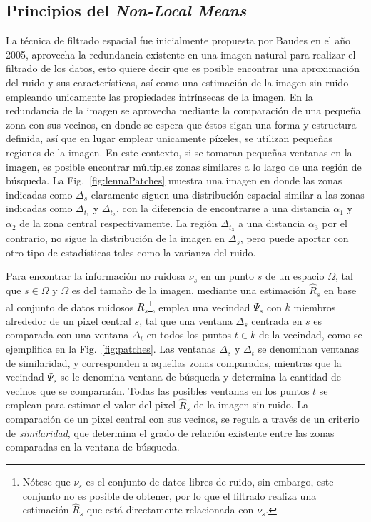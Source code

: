 \subsection{Principios del \textit{Non-Local Means}}

La técnica de filtrado espacial \nlmeans fue inicialmente propuesta por Baudes \etal \cite{Baudes2005} en el año 2005, \nlmeans aprovecha la redundancia existente en una imagen natural para realizar el filtrado de los datos, esto quiere decir que es posible encontrar una aproximación del ruido y sus características, así como una estimación de la imagen sin ruido empleando unicamente las propiedades intrínsecas de la imagen. En \nlmeans la redundancia de la imagen se aprovecha mediante la comparación de una pequeña zona con sus vecinos, en donde se espera que éstos sigan una forma y estructura definida, así que en lugar emplear unicamente píxeles, se utilizan pequeñas regiones de la imagen. En este contexto, si se tomaran pequeñas ventanas en la imagen, es posible encontrar múltiples zonas similares a lo largo de una región de búsqueda. La Fig.~\ref{fig:lennaPatches} muestra una imagen en donde las zonas indicadas como $\Delta_s$ claramente siguen una distribución espacial similar a las zonas indicadas como $\Delta_{t_1}$ y $\Delta_{t_2}$, con la diferencia de encontrarse a una distancia $\alpha_1$ y $\alpha_2$ de la zona central respectivamente. La región $\Delta_{t_3}$ a una distancia $\alpha_3$ por el contrario, no sigue la distribución de la imagen en $\Delta_s$, pero puede aportar con otro tipo de estadísticas tales como la varianza del ruido.%

Para encontrar la información no ruidosa $\nu_s$ en un punto $s$ de un espacio $\Omega$, tal que $s\in \Omega$ y $\Omega$ es del tamaño de la imagen, mediante una estimación $\hat{R}_s$ en base al conjunto de datos ruidosos $R_s$\footnote{Nótese que $\nu_s$ es el conjunto de datos libres de ruido, sin embargo, este conjunto no es posible de obtener, por lo que el filtrado realiza una estimación $\hat{R}_s$ que está directamente relacionada con $\nu_s$.}, \nlmeans emplea una vecindad $\Psi_s$ con $k$ miembros alrededor de un pixel central $s$, tal que una ventana $\Delta_{s}$ centrada en $s$ es comparada con una ventana $\Delta_t$ en todos los puntos $t\in k$ de la vecindad, como se ejemplifica en la Fig.~\ref{fig:patches}. Las ventanas $\Delta_s$ y $\Delta_t$ se denominan ventanas de similaridad, y corresponden a aquellas zonas comparadas, mientras que la vecindad $\Psi_s$ se le denomina ventana de búsqueda y determina la cantidad de vecinos que se compararán. Todas las posibles ventanas en los puntos $t$ se emplean para estimar el valor del pixel $\hat{R}_s$ de la imagen sin ruido. La comparación de un pixel central con sus vecinos, se regula a través de un criterio de \emph{similaridad}, que determina el grado de relación existente entre las zonas comparadas en la ventana de búsqueda.

